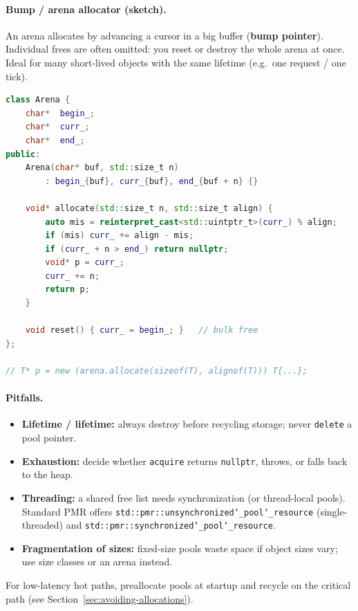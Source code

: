 \paragraph*{Bump / arena allocator (sketch).}
An arena allocates by advancing a cursor in a big buffer (\textbf{bump pointer}).
Individual frees are often omitted: you reset or destroy the whole arena at once.
Ideal for many short-lived objects with the same lifetime (e.g.\ one request / one tick).

\begin{lstlisting}[language=C++]
class Arena {
    char*  begin_;
    char*  curr_;
    char*  end_;
public:
    Arena(char* buf, std::size_t n)
        : begin_{buf}, curr_{buf}, end_{buf + n} {}

    void* allocate(std::size_t n, std::size_t align) {
        auto mis = reinterpret_cast<std::uintptr_t>(curr_) % align;
        if (mis) curr_ += align - mis;
        if (curr_ + n > end_) return nullptr;
        void* p = curr_;
        curr_ += n;
        return p;
    }

    void reset() { curr_ = begin_; }   // bulk free
};

// T* p = new (arena.allocate(sizeof(T), alignof(T))) T{...};
\end{lstlisting}

\paragraph*{Pitfalls.}
\begin{itemize}
    \item \textbf{Lifetime / lifetime:} always destroy before recycling storage; 
          never \texttt{delete} a pool pointer.
    \item \textbf{Exhaustion:} decide whether \texttt{acquire} returns 
          \texttt{nullptr}, throws, or falls back to the heap.
    \item \textbf{Threading:} a shared free list needs synchronization (or 
          thread-local pools). Standard PMR offers 
          \texttt{std::pmr::unsynchronized\char`_pool\char`_resource} (single-threaded) 
          and \texttt{std::pmr::synchronized\char`_pool\char`_resource}.
    \item \textbf{Fragmentation of sizes:} fixed-size pools waste space if 
          object sizes vary; use size classes or an arena instead.
\end{itemize}
For low-latency hot paths, preallocate pools at startup and recycle on the 
critical path (see Section~\ref{sec:avoiding-allocations}).

